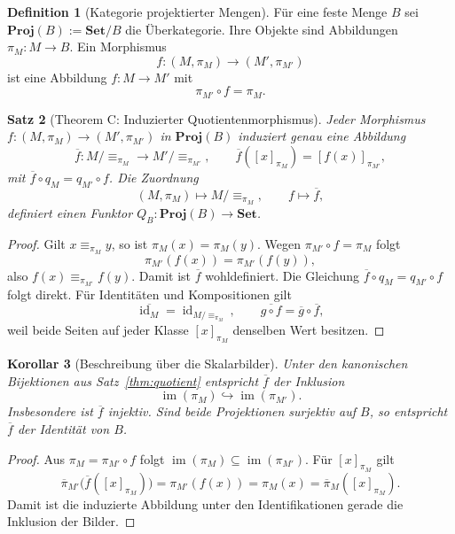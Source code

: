 \documentclass[11pt,a4paper,reqno]{amsart}
\newtheorem{theorem}{Satz}[section]
\newtheorem{corollary}[theorem]{Korollar}
\theoremstyle{definition}
\newtheorem{definition}[theorem]{Definition}
\theoremstyle{remark}
\newcommand{\im}{\operatorname{im}}
\newcommand{\id}{\operatorname{id}}
\newcommand{\eqpim}{\mathrel{\equiv_{\pi_M}}}
\newcommand{\eqpip}{\mathrel{\equiv_{\pi_{M'}}}}
\begin{document}
\begin{definition}[Kategorie projektierter Mengen]
Für eine feste Menge $B$ sei $\mathbf{Proj}(B):=\mathbf{Set}/B$ die Überkategorie. Ihre Objekte sind Abbildungen $\pi_M\colon M\to B$. Ein Morphismus
\[
  f\colon(M,\pi_M)\longrightarrow(M',\pi_{M'})
\]
ist eine Abbildung $f\colon M\to M'$ mit
\[
  \pi_{M'}\circ f=\pi_M.
\]
\end{definition}

\begin{theorem}[Theorem C: Induzierter Quotientenmorphismus]
\label{thm:functoriality}
Jeder Morphismus $f\colon(M,\pi_M)\to(M',\pi_{M'})$ in $\mathbf{Proj}(B)$ induziert genau eine Abbildung
\[
  \overline f\colon M/{\equiv_{\pi_M}}
  \longrightarrow M'/{\equiv_{\pi_{M'}}},
  \qquad
  \overline f([x]_{\pi_M})=[f(x)]_{\pi_{M'}},
\]
mit $\overline f\circ q_M=q_{M'}\circ f$. Die Zuordnung
\[
  (M,\pi_M)\longmapsto M/{\equiv_{\pi_M}},
  \qquad f\longmapsto\overline f,
\]
definiert einen Funktor $Q_B\colon\mathbf{Proj}(B)\to\mathbf{Set}$.
\end{theorem}

\begin{proof}
Gilt $x\eqpim y$, so ist $\pi_M(x)=\pi_M(y)$. Wegen $\pi_{M'}\circ f=\pi_M$ folgt
\[
  \pi_{M'}(f(x))=\pi_{M'}(f(y)),
\]
also $f(x)\eqpip f(y)$. Damit ist $\overline f$ wohldefiniert. Die Gleichung $\overline f\circ q_M=q_{M'}\circ f$ folgt direkt. Für Identitäten und Kompositionen gilt
\[
  \overline{\id_M}=\id_{M/{\equiv_{\pi_M}}},
  \qquad
  \overline{g\circ f}=\overline g\circ\overline f,
\]
weil beide Seiten auf jeder Klasse $[x]_{\pi_M}$ denselben Wert besitzen.
\end{proof}

\begin{corollary}[Beschreibung über die Skalarbilder]
Unter den kanonischen Bijektionen aus Satz~\ref{thm:quotient} entspricht $\overline f$ der Inklusion
\[
  \im(\pi_M)\hookrightarrow\im(\pi_{M'}).
\]
Insbesondere ist $\overline f$ injektiv. Sind beide Projektionen surjektiv auf $B$, so entspricht $\overline f$ der Identität von $B$.
\end{corollary}

\begin{proof}
Aus $\pi_M=\pi_{M'}\circ f$ folgt $\im(\pi_M)\subseteq\im(\pi_{M'})$. Für $[x]_{\pi_M}$ gilt
\[
  \overline\pi_{M'}\bigl(\overline f([x]_{\pi_M})\bigr)
  =\pi_{M'}(f(x))
  =\pi_M(x)
  =\overline\pi_M([x]_{\pi_M}).
\]
Damit ist die induzierte Abbildung unter den Identifikationen gerade die Inklusion der Bilder.
\end{proof}
\end{document}

